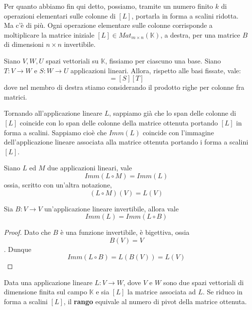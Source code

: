 Per quanto abbiamo fin qui detto, possiamo, tramite un numero finito $k$ di
operazioni elementari sulle colonne di $[L]$, portarla in forma a scalini
ridotta. Ma c'\`e di pi\`u. Ogni operazione elementare sulle colonne corrisponde
a moltiplicare la matrice iniziale $[L] \in Mat_{m \times n}(\mathbb{K})$,
a destra, per una matrice $B$ di dimensioni $n \times n$ invertibile.

\begin{theorem}
	Siano $V, W, U$ spazi vettoriali su $\mathbb{K}$, fissiamo per ciascuno
	una base. Siano $T : V \to W$ e $S : W \to U$ applicazioni lineari. Allora,
	rispetto alle basi fissate, vale:
	\begin{equation*}
		[S \circ T] = [S][T]
	\end{equation*}
	dove nel membro di destra stiamo considerando il prodotto righe per colonne
	fra matrici.
\end{theorem}

Tornando all'applicazione lineare $L$, sappiamo già che lo span delle colonne
di $[L]$ coincide con lo span delle colonne della matrice ottenuta portando $[L]$
in forma a scalini. Sappiamo cio\`e che $Imm(L)$ coincide con l'immagine
dell'applicazione lineare associata alla matrice ottenuta portando i forma a
scalini $[L]$.

\begin{proposition}
	Siano $L$ ed $M$ due applicazioni lineari, vale
	\[ Imm(L \circ M) = Imm(L) \]
	ossia, scritto con un'altra notazione,
	\[ (L \circ M)(V) = L(V) \]
\end{proposition}

\begin{proposition}
	Sia $B : V \to V$ un'applicazione lineare invertibile, allora vale
	\[ Imm(L) = Imm(L \circ B) \]
	\begin{proof}
		Dato che $B$ \`e una funzione invertibile, \`e bigettiva, ossia
		\[ B(V) = V \]. Dunque
		\begin{equation*}
			Imm(L \circ B) = L(B(V)) = L(V)
		\end{equation*}
	\end{proof}
\end{proposition}

\begin{definition}
	Data una applicazione lineare $L : V \to W$, dove $V$ e $W$ sono due spazi
	vettoriali di dimensione finita sul campo $\mathbb{K}$ e sia $[L]$ la matrice
	associata ad $L$. Se riduco in forma a scalini $[L]$, il \textbf{rango} equivale
	al numero di pivot della matrice ottenuta.
\end{definition}

